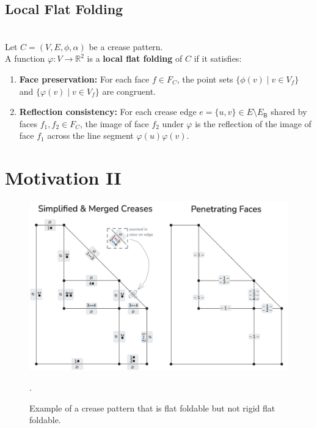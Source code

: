 \section{Local Flat Folding}

\begin{definition}
~\\
Let $C = (V, E, \phi, \alpha)$ be a crease pattern.\\
A function $\varphi: V \to \mathbb{R}^2$ is a \textbf{local flat folding} of $C$ if it satisfies:

\begin{enumerate}
    \item \textbf{Face preservation:} For each face $f \in F_C$, the point sets $\{\phi(v) \mid v \in V_f\}$ and $\{\varphi(v) \mid v \in V_f\}$ are congruent.
    \item \textbf{Reflection consistency:} For each crease edge $e = \{u,v\} \in E \setminus E_{\mathsf{B}}$ shared by faces $f_1, f_2 \in F_C$, the image of face $f_2$ under $\varphi$ is the reflection of the image of face $f_1$ across the line segment $\varphi(u)\varphi(v)$.
\end{enumerate}
\end{definition}

\chapter{Motivation II}

\begin{figure}[h]
\centering
\includegraphics[width=\textwidth]{assets/demo_shadowgraph.png}
\caption{Example of a crease pattern that is flat foldable but not rigid flat foldable.}.
\label{fig:demo_shadowgraph}
\end{figure}

